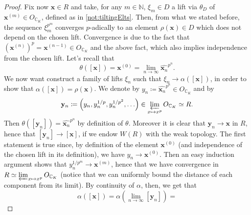 \begin{proof}
	Fix now $\mathbf{x} \in R$ and take, for any $m \in \mathbb{N}$, 
	$\xi_m \in D$ a lift via $\theta_D$ of $\mathbf{x}^{(m)} \in O_{\mathbb{C}_K}$, defined
	as in \cref{not:tiltingElts}.
	Then, from what we stated before, the sequence $\xi_m^{p^m}$ converges
	$p$-adically to an element $\rho(\mathbf{x}) \in D$ which does not depend on the chosen lift.
	Convergence is due to the fact that $(\mathbf{x}^{(n)})^p = \mathbf{x}^{(n-1)} \in O_{\mathbb{C}_K}$
	and the above fact, which also implies independence from the chosen lift.
	Let's recall that
	\begin{equation*}
	\theta([\mathbf{x}]) = \mathbf{x}^{(0)} =
	\lim_{n \to \infty} \widehat{\mathbf{x}_n}^{p^n}
	.\end{equation*}
	We now want construct a family of lifts
	$\xi_n$ such that $\xi_n \to \alpha([\mathbf{x}])$, in order
	to show that $\alpha([\mathbf{x}]) = \rho(\mathbf{x})$.
	We denote by $y_n \coloneqq \widehat{\mathbf{x}_n}^{p^n} \in O_{\mathbb{C}_K}$
	and by
	\begin{equation*}
		\mathbf{y}_n \coloneqq \left( y_n, y_n^{1/p}, y_n^{1/p^2}, \ldots \right) \in 
		\varprojlim_{x \mapsto x^p} O_{\mathbb{C}_K} \simeq R
	.\end{equation*}
	Then $\theta([\mathbf{y}_n]) = \widehat{\mathbf{x}_n}^{p^n}$ by definition of $\theta$.
	Moreover it is clear that $\mathbf{y}_n \to \mathbf{x}$ in $R$,
	hence that $[\mathbf{y}_n] \to [\mathbf{x}]$, if we endow $W(R)$ with the weak topology.
	The first statement is true since, by definition of the element $\mathbf{x}^{(0)}$
	(and independence of the chosen lift in its definition), we have
	$y_n \to \mathbf{x}^{(0)}$. Then an easy induction argument
	shows that $y_n^{1/p^m} \to \mathbf{x}^{(m)}$, hence that we have convergence
	in $R \simeq \varprojlim_{x \mapsto x^p}O_{\mathbb{C}_K}$ (notice that we
	can uniformly bound the distance of each component from its limit).
	By continuity of $\alpha$, then, we get that
	\begin{equation*}
		\alpha([\mathbf{x}]) = \alpha\left(\lim_{n \to \infty} [\mathbf{y}_n]\right) =

\end{equation*}
\end{proof}
